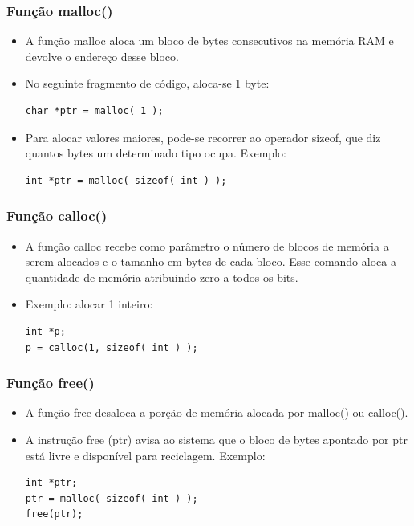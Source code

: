 \documentclass[aspectratio=169]{beamer}
\begin{document}
\begin{frame}[fragile]
\frametitle{Função malloc()}
\begin{itemize}
\item A função  malloc  aloca um bloco de bytes consecutivos na memória RAM e devolve o endereço desse bloco.  
\item No seguinte fragmento de código, aloca-se 1 byte: 
\begin{lstlisting}
char *ptr = malloc( 1 );
\end{lstlisting}
\item Para alocar valores maiores, pode-se recorrer ao operador sizeof, que diz quantos bytes um determinado tipo ocupa. Exemplo:
\begin{lstlisting}
int *ptr = malloc( sizeof( int ) );
\end{lstlisting}
\end{itemize}
\end{frame}


\begin{frame}[fragile]
\frametitle{Função calloc()}
\begin{itemize}
\item A função calloc recebe como parâmetro o número de blocos de memória a serem alocados e o tamanho em bytes de cada bloco. Esse comando aloca a quantidade de memória atribuindo zero a todos os bits.
\item Exemplo: alocar 1 inteiro:
\begin{lstlisting}
int *p;
p = calloc(1, sizeof( int ) );
\end{lstlisting}
\end{itemize}
\end{frame}


\begin{frame}[fragile]
\frametitle{Função free()}
\begin{itemize}
\item A função free desaloca a porção de memória alocada por malloc() ou calloc(). 
\item A instrução free (ptr) avisa ao sistema que o bloco de bytes apontado por ptr está livre e disponível para reciclagem. Exemplo:
\begin{lstlisting}
int *ptr;
ptr = malloc( sizeof( int ) );
free(ptr);
\end{lstlisting}
\end{itemize}
\end{frame}
\end{document}
